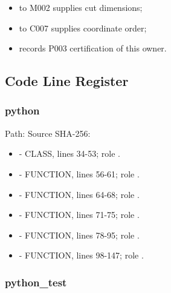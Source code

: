 \begin{itemize}
\tightlist
\item
  \texttt{\protect{}} to M002 supplies cut dimensions;
\item
  \texttt{\protect{}} to C007 supplies coordinate order;
\item
  \texttt{\protect{}} records P003 certification of this owner.
\end{itemize}

\subsection{Code Line Register}\label{code-line-register-4}

\subsubsection{python}\label{python-4}

Path:
Source SHA-256:
\texttt{\protect{}}

\begin{itemize}
\tightlist
\item
  \texttt{\protect{}} - CLASS, lines 34-53; role
  \texttt{\protect{}}.
\item
  \texttt{\protect{}} - FUNCTION, lines 56-61; role
  \texttt{\protect{}}.
\item
  \texttt{\protect{}} - FUNCTION, lines 64-68; role
  \texttt{\protect{}}.
\item
  \texttt{\protect{}} - FUNCTION, lines 71-75; role
  \texttt{\protect{}}.
\item
  \texttt{\protect{}} - FUNCTION,
  lines 78-95; role \texttt{\protect{}}.
\item
  \texttt{\protect{}} - FUNCTION, lines
  98-147; role \texttt{\protect{}}.
\end{itemize}

\subsubsection{python\_test}\label{python_test-3}

